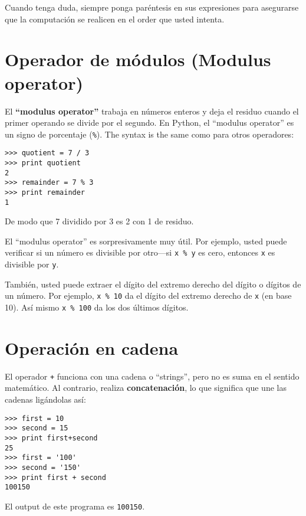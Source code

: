 Cuando tenga duda, siempre ponga par\'entesis en sus expresiones para asegurarse que la computaci\'on se realicen en el order que usted intenta.

\section{Operador de m\'odulos (Modulus operator)}


El {\bf ``modulus operator''} trabaja en n\'umeros enteros y deja el residuo cuando el primer operando se divide por el segundo. En Python, el 
``modulus operator'' es un signo de porcentaje (\verb"%").  The syntax is the same
como para otros operadores:

\beforeverb
\begin{verbatim}
>>> quotient = 7 / 3
>>> print quotient
2
>>> remainder = 7 % 3
>>> print remainder
1
\end{verbatim}
\afterverb
%
De modo que 7 dividido por 3 es 2 con 1 de residuo.

El ``modulus operator'' es sorpresivamente muy \'util. Por ejemplo, usted puede verificar si un n\'umero es divisible por otro---si
{\tt x \% y} es cero, entonces {\tt x} es divisible por {\tt y}.


Tambi\'en, usted puede extraer el d\'igito del extremo derecho del d\'igito o d\'igitos de un n\'umero. Por ejemplo, {\tt x \% 10} da el d\'igito del extremo derecho de {\tt x} (en base 10).  As\'i mismo {\tt x \% 100}
da los dos \'ultimos d\'igitos.



\section{Operaci\'on en cadena}

El operador {\tt +} funciona con una cadena o ``strings'', pero no es suma en el sentido matem\'atico. Al contrario, realiza 
{\bf concatenaci\'on}, lo que significa que une las cadenas lig\'andolas as\'i:


\beforeverb
\begin{verbatim}
>>> first = 10
>>> second = 15
>>> print first+second
25
>>> first = '100'
>>> second = '150'
>>> print first + second
100150
\end{verbatim}
\afterverb
%
El output de este programa es {\tt 100150}.

